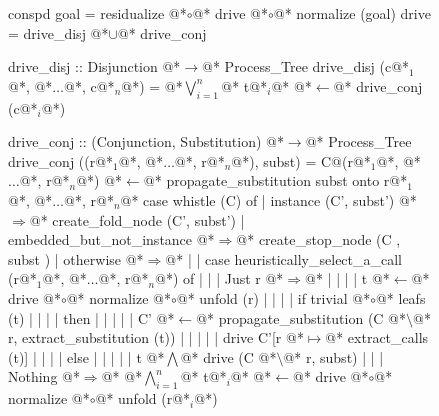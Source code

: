 \documentclass[12pt,a4paper]{report}
\begin{document}
\thispagestyle{empty}
\begin{figure}[h]
\begin{PseudoCode}[moredelim={[is][stringstyle]{@@}{@@}},
  moredelim={[is][\color{dkgreen}\bfseries]{@!}{@!}},
  moredelim={[is][\color{red}\bfseries]{!!}{!!}}]
conspd goal = residualize @*$\circ$@* drive @*$\circ$@* normalize (goal)
drive       = drive_disj @*$\cup$@* drive_conj

drive_disj :: Disjunction @*$\to$@* Process_Tree
drive_disj (c@*$_1$@*, @*$\dots$@*, c@*$_n$@*) = @*$\bigvee_{i=1}^n$@* t@*$_i$@* @*$\leftarrow$@* drive_conj (c@*$_i$@*)

drive_conj :: (Conjunction, Substitution) @*$\to$@* Process_Tree
drive_conj ((r@*$_1$@*, @*$\dots$@*, r@*$_n$@*), subst) =
  C@(r@*$_1$@*, @*$\dots$@*, r@*$_n$@*) @*$\leftarrow$@* propagate_substitution subst onto r@*$_1$@*, @*$\dots$@*, r@*$_n$@*
  case whistle (C) of
  | instance (C', subst')     @*$\Rightarrow$@* create_fold_node (C', subst')
  | embedded_but_not_instance @*$\Rightarrow$@* create_stop_node (C , subst )
  | otherwise @*$\Rightarrow$@*
  | | case heuristically_select_a_call (r@*$_1$@*, @*$\dots$@*, r@*$_n$@*) of
  | | | Just r @*$\Rightarrow$@*
  | | | | t @*$\leftarrow$@* drive @*$\circ$@* normalize @*$\circ$@* unfold (r)
  | | | | if trivial @*$\circ$@* leafs (t)
  | | | | then
  | | | | | C' @*$\leftarrow$@* propagate_substitution (C @*$\setminus$@* r, extract_substitution (t))
  | | | | | drive C'[r @*$\mapsto$@* extract_calls (t)]
  | | | | else
  | | | | | t @*$\bigwedge$@* drive (C @*$\setminus$@* r, subst)
  | | | Nothing @*$\Rightarrow$@* @*$\bigwedge_{i=1}^n$@* t@*$_i$@* @*$\leftarrow$@* drive @*$\circ$@* normalize @*$\circ$@* unfold (r@*$_i$@*)
\end{PseudoCode}
\end{figure}
\end{document}
